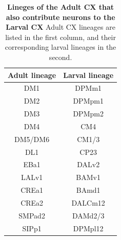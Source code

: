     \begin{table}
    \centering
    \begin{tabular}{|c|c|}
    \hline
    Adult lineage & Larval lineage \\
    \hline
    DM1 & DPMm1 \\
    DM2 & DPMpm1 \\
    DM3 & DPMpm2 \\
    DM4 & CM4 \\
    DM5/DM6 & CM1/3 \\
    DL1 & CP23 \\
    EBa1 & DALv2 \\
    LALv1 & BAMv1 \\
    CREa1 & BAmd1 \\
    CREa2 & DALCm12 \\
    SMPad2 & DAMd2/3 \\
    SIPp1 & DPMpl12 \\
    \bottomrule
    \end{tabular}
    \caption[Lineges of the Adult CX that also contribute neurons to the Larval CX]{\textbf{Lineges of the Adult CX that also contribute neurons to the Larval CX} Adult CX lineages are listed in the first column, and their corresponding larval lineages in the second.}
    \label{lineagemap}
    \end{table}
 
